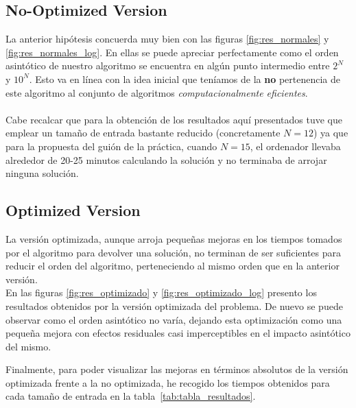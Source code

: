 \documentclass[british,a4paper,11pt,titlepage]{article}
\begin{document}
    \subsection{No-Optimized Version}
    La anterior hipótesis concuerda muy bien con las figuras \ref{fig:res_normales} y \ref{fig:res_normales_log}. En ellas se puede apreciar perfectamente como el orden asintótico de nuestro algoritmo se encuentra en algún punto intermedio entre $2^N$ y $10^N$. Esto va en línea con la idea inicial que teníamos de la \textbf{no} pertenencia de este algoritmo al conjunto de algoritmos \emph{computacionalmente eficientes}.
    \\
    \\
    Cabe recalcar que para la obtención de los resultados aquí presentados tuve que emplear un tamaño de entrada bastante reducido (concretamente $N=12$) ya que para la propuesta del guión de la práctica, cuando $N=15$, el ordenador llevaba alrededor de 20-25 minutos calculando la solución y no terminaba de arrojar ninguna solución.

    \subsection{Optimized Version}
    La versión optimizada, aunque arroja pequeñas mejoras en los tiempos tomados por el algoritmo para devolver una solución, no terminan de ser suficientes para reducir el orden del algoritmo, perteneciendo al mismo orden que en la anterior versión.
    \\
    En las figuras \ref{fig:res_optimizado} y \ref{fig:res_optimizado_log} presento los resultados obtenidos por la versión optimizada del problema. De nuevo se puede observar como el orden asintótico no varía, dejando esta optimización como una pequeña mejora con efectos residuales casi imperceptibles en el impacto asintótico del mismo.

    Finalmente, para poder visualizar las mejoras en términos absolutos de la versión optimizada frente a la no optimizada, he recogido los tiempos
    obtenidos para cada tamaño de entrada en la tabla~\ref{tab:tabla_resultados}.
\end{document}
